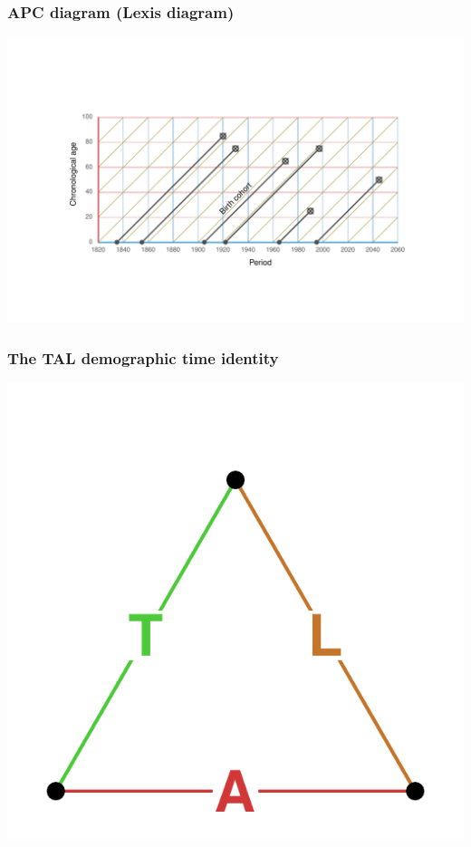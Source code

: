 \documentclass[20pt]{beamer}
\begin{document}

\begin{frame}
\frametitle{APC diagram (Lexis diagram)}
\begin{center}
\includegraphics[trim= 200 200 200 200, scale=1.5]{Figures/APCrt.pdf}
\end{center}
\end{frame}


\begin{frame}
\frametitle{The TAL demographic time identity}
\vspace{-4em}
\begin{center}
\includegraphics[scale=1.7]{Figures/TALid.pdf}
\end{center}
\end{frame}
\end{document}
